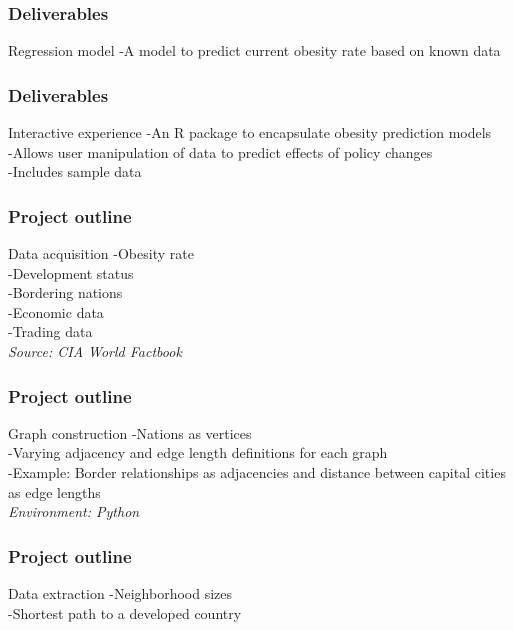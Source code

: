 \documentclass{beamer}
\begin{document}
\begin{frame}
\frametitle{Deliverables}
\begin{block}
{Regression model}
-A model to predict current obesity rate based on known data
\end{block}
\end{frame}

\begin{frame}
\frametitle{Deliverables}
\begin{block}
{Interactive experience}
-An R package to encapsulate obesity prediction models
\\
-Allows user manipulation of data to predict effects of policy changes
\\
-Includes sample data
\end{block}
\end{frame}
 
\begin{frame}
\frametitle{Project outline}
\begin{block}
{Data acquisition}
-Obesity rate
\\
-Development status
\\
-Bordering nations
\\
-Economic data
\\
-Trading data
\\
{\emph{Source: CIA World Factbook}}
\end{block}
\end{frame}

\begin{frame}
\frametitle{Project outline}
\begin{block}
{Graph construction}
-Nations as vertices
\\
-Varying adjacency and edge length definitions for each graph
\\
-Example: Border relationships as adjacencies and distance between capital cities as edge lengths
\\
{\emph{Environment: Python}}
\end{block}
\end{frame}

\begin{frame}
\frametitle{Project outline}
\begin{block}
{Data extraction}
-Neighborhood sizes
\\
-Shortest path to a developed country
\end{block}
\end{frame}
\end{document}
